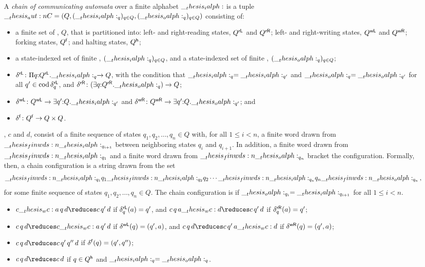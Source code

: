 \begin{definition}
  A \emph{chain of communicating automata} over a finite alphabet $\__thesis_ialph:$ is a tuple $\__thesis_aut:n {C} = (Q, (\__thesis_ialph:_q)_{q \in Q}, (\__thesis_oalph:_q)_{q \in Q})$ consisting of:
  \begin{itemize}
  \item a finite set of , $Q$, that is partitioned into: left- and right-reading states, $Q^{\mathsf{rL}}$ and $Q^{\mathsf{rR}}$; left- and right-writing states, $Q^{\mathsf{wL}}$ and $Q^{\mathsf{wR}}$; forking states, $Q^{\mathsf{f}}$; and halting states, $Q^{\mathsf{h}}$;
  \item a state-indexed set of finite , $(\__thesis_ialph:_q)_{q \in Q}$, and a state-indexed set of finite , $(\__thesis_oalph:_q)_{q \in Q}$;
  \item $\delta^{\mathsf{rL}} \colon \Pi q{:}Q^{\mathsf{rL}}. \__thesis_ialph:_q \to Q$, with the condition that $\__thesis_ialph:_q = \__thesis_ialph:_{q'}$ and $\__thesis_oalph:_q = \__thesis_oalph:_{q'}$ for all $q' \in \operatorname{cod}{\delta^{\mathsf{rL}}_q}$, and $\delta^{\mathsf{rR}} \colon (\exists q{:}Q^{\mathsf{rR}}. \__thesis_oalph:_q) \to Q$;
  \item $\delta^{\mathsf{wL}} \colon Q^{\mathsf{wL}} \to \exists q'{:}Q. \__thesis_ialph:_{q'}$ and $\delta^{\mathsf{wR}} \colon Q^{\mathsf{wR}} \to \exists q'{:}Q. \__thesis_oalph:_{q'}$; and
  \item $\delta^{\mathsf{f}} \colon Q^{\mathsf{f}} \to Q \times Q$.
  \end{itemize}

  , $c$ and $d$, consist of a finite sequence of states $q_1, q_2, \dotsc, q_n \in Q$ with, for all $1 \leq i < n$, a finite word drawn from $\__thesis_finwds:n {\__thesis_ialph:_{q_{i+1}}}$ between neighboring states $q_i$ and $q_{i+1}$.
  In addition, a finite word drawn from $\__thesis_finwds:n {\__thesis_ialph:_{q_1}}$ and a finite word drawn from $\__thesis_finwds:n {\__thesis_oalph:_{q_n}}$ bracket the configuration.
  Formally, then, a chain configuration is a string drawn from the set
  \begin{equation*}
    \__thesis_finwds:n {\__thesis_ialph:_{q_1}} q_1 \__thesis_finwds:n {\__thesis_ialph:_{q_2}} q_2 \dotsm \__thesis_finwds:n {\__thesis_ialph:_{q_n}} q_n \__thesis_finwds:n {\__thesis_oalph:_{q_n}}
    \,,
  \end{equation*}
  for some finite sequence of states $q_1, q_2, \dotsc, q_n \in Q$.
  The chain configuration is  if $\__thesis_oalph:_{q_i} = \__thesis_ialph:_{q_{i+1}}$ for all $1 \leq i < n$.

  \begin{itemize}
  \item $c \wc a \,q\, d \reduces c \,q'\, d$ if $\delta^{\mathsf{rL}}_q(a) = q'$, and $c \,q\, a \wc d \reduces c \,q'\, d$ if $\delta^{\mathsf{rR}}_q(a) = q'$;
  \item $c \,q\, d \reduces c \wc a \,q'\, d$ if $\delta^{\mathsf{wL}}(q) = (q', a)$, and $c \,q\, d \reduces c \,q'\, a \wc d$ if $\delta^{\mathsf{wR}}(q) = (q', a)$;

  \item $c \,q\, d \reduces c \, q' \, q'' \, d$ if $\delta^{\mathsf{f}}(q) = (q', q'')$;
  \item $c \,q\, d \reduces c \, d$ if $q \in Q^{\mathsf{h}}$ and $\__thesis_ialph:_q = \__thesis_oalph:_q$.
  \end{itemize}
\end{definition}


